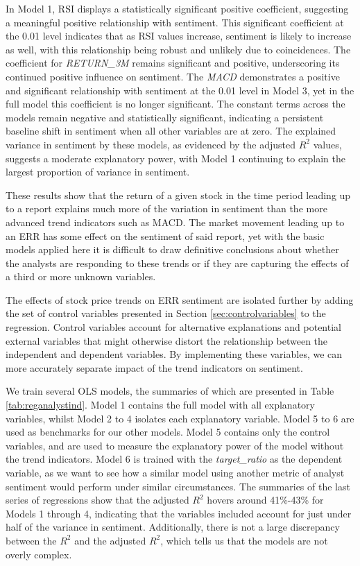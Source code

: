 
In Model 1, RSI displays a statistically significant positive coefficient, suggesting a meaningful positive relationship with sentiment. This significant coefficient at the 0.01 level indicates that as RSI values increase, sentiment is likely to increase as well, with this relationship being robust and unlikely due to coincidences. The coefficient for \textit{RETURN\_3M} remains significant and positive, underscoring its continued positive influence on sentiment. The \textit{MACD} demonstrates a positive and significant relationship with sentiment at the 0.01 level in Model 3, yet in the full model this coefficient is no longer significant. The constant terms across the models remain negative and statistically significant, indicating a persistent baseline shift in sentiment when all other variables are at zero. The explained variance in sentiment by these models, as evidenced by the adjusted $R^2$ values, suggests a moderate explanatory power, with Model 1 continuing to explain the largest proportion of variance in sentiment.

These results show that the return of a given stock in the time period leading up to a report explains much more of the variation in sentiment than the more advanced trend indicators such as MACD. The market movement leading up to an ERR has some effect on the sentiment of said report, yet with the basic models applied here it is difficult to draw definitive conclusions about whether the analysts are responding to these trends or if they are capturing the effects of a third or more unknown variables. 

The effects of stock price trends on ERR sentiment are isolated further by adding the set of control variables presented in Section \ref{sec:controlvariables} to the regression. Control variables account for alternative explanations and potential external variables that might otherwise distort the relationship between the independent and dependent variables. By implementing these variables, we can more accurately separate impact of the trend indicators on sentiment.

We train several OLS models, the summaries of which are presented in Table \ref{tab:reganalystind}. Model 1 contains the full model with all explanatory variables, whilst Model 2 to 4 isolates each explanatory variable. Model 5 to 6 are used as benchmarks for our other models. Model 5 contains only the control variables, and are used to measure the explanatory power of the model without the trend indicators. Model 6 is trained with the \textit{target\_ratio} as the dependent variable, as we want to see how a similar model using another metric of analyst sentiment would perform under similar circumstances. The summaries of the last series of regressions show that the adjusted \(R^2\) hovers around 41\%-43\% for Models 1 through 4, indicating that the variables included account for just under half of the variance in sentiment. Additionally, there is not a large discrepancy between the \(R^2\) and the adjusted \(R^2\), which tells us that the models are not overly complex.

